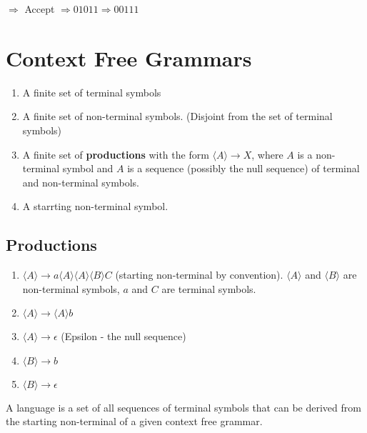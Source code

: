 \documentclass[a4paper,12pt]{article}
\begin{document}
$\Rightarrow$ Accept $\Rightarrow 01011 \Rightarrow 00111$

\section*{Context Free Grammars}

\begin{enumerate}

\item A finite set of terminal symbols

\item A finite set of non-terminal symbols. (Disjoint from the set of
terminal symbols)

\item A finite set of \textbf{productions} with the form $\langle A
\rangle \to X$, where $A$ is a non-terminal symbol and $A$ is a sequence
(possibly the null sequence) of terminal and non-terminal symbols.

\item A starrting non-terminal symbol.

\end{enumerate}

\subsection*{Productions}

\begin{enumerate}

\item $\langle A \rangle \to a \langle A \rangle \langle A \rangle
\langle B \rangle C$ (starting non-terminal by convention). $\langle A
\rangle$ and $\langle B \rangle$ are non-terminal symbols, $a$ and $C$
are terminal symbols.

\item $\langle A \rangle \to \langle A \rangle b$

\item $\langle A \rangle \to \epsilon$ (Epsilon - the null sequence)

\item $\langle B \rangle \to b$

\item $\langle B \rangle \to \epsilon$

\end{enumerate}

A language is a set of all sequences of terminal symbols that can be
derived from the starting non-terminal of a given context free grammar.
\end{document}
